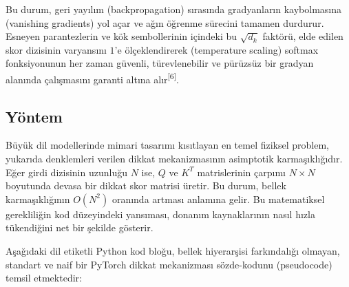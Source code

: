 \documentclass[11pt,a4paper]{article}
\begin{document}
Bu durum, geri yayılım (backpropagation) sırasında gradyanların kaybolmasına (vanishing gradients) yol açar ve ağın öğrenme sürecini tamamen durdurur. Esneyen parantezlerin ve kök sembollerinin içindeki bu \(\sqrt{d_k}\) faktörü, elde edilen skor dizisinin varyansını \(1\)'e ölçeklendirerek (temperature scaling) softmax fonksiyonunun her zaman güvenli, türevlenebilir ve pürüzsüz bir gradyan alanında çalışmasını garanti altına alır\textsuperscript{[6]}.

\subsection{Yöntem}
Büyük dil modellerinde mimari tasarımı kısıtlayan en temel fiziksel problem, yukarıda denklemleri verilen dikkat mekanizmasının asimptotik karmaşıklığıdır. Eğer girdi dizisinin uzunluğu \(N\) ise, \(Q\) ve \(K^T\) matrislerinin çarpımı \(N \times N\) boyutunda devasa bir dikkat skor matrisi üretir. Bu durum, bellek karmaşıklığının \(O(N^2)\) oranında artması anlamına gelir. Bu matematiksel gerekliliğin kod düzeyindeki yansıması, donanım kaynaklarının nasıl hızla tükendiğini net bir şekilde gösterir.

Aşağıdaki dil etiketli Python kod bloğu, bellek hiyerarşisi farkındalığı olmayan, standart ve naif bir PyTorch dikkat mekanizması sözde-kodunu (pseudocode) temsil etmektedir:
\end{document}

